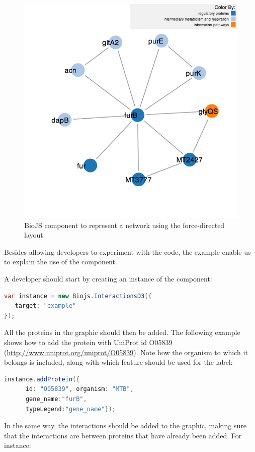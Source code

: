 \begin{figure}[ht]
\centering
\includegraphics[width=4.5in]{figures/force.png}
\caption[BioJS component to represent a network using the force-directed layout]{BioJS component to represent a network using the force-directed layout
\label{fig:biojs_force}}
\end{figure}

Besides allowing developers to experiment with the code, the example enable us to explain the use of the component. 

A developer should start by creating an instance of the component:

\begin{lstlisting}[language=java]
var instance = new Biojs.InteractionsD3({
   target: "example"
});
\end{lstlisting}
					
All the proteins in the graphic should then be added. The following example shows how to add the protein with UniProt id O05839 (\url{http://www.uniprot.org/uniprot/O05839}). Note how the organism to which it belongs is included, along with which feature should be used for the label:

\begin{lstlisting}[language=java]
instance.addProtein({
      id: "O05839", organism: "MTB",
      gene_name:"furB",
      typeLegend:"gene_name"});
\end{lstlisting}
					
In the same way, the interactions should be added to the graphic, making sure that the interactions are between proteins that have already been added. For instance:

